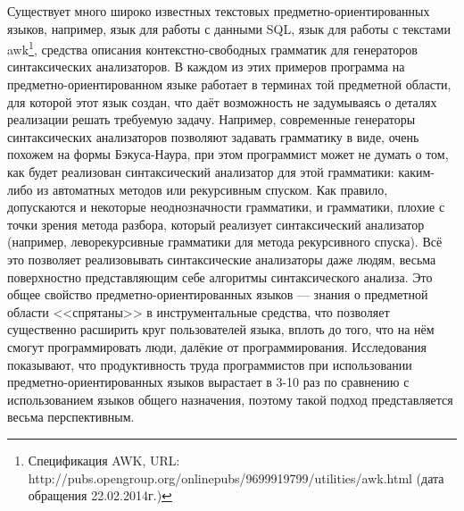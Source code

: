 Существует много широко известных текстовых предметно-ориентированных языков, 
например, язык для работы с данными \ac{SQL}, 
язык для работы с текстами awk\footnote{Спецификация AWK, URL: http://pubs.opengroup.org/onlinepubs/9699919799/utilities/awk.html 
(дата обращения 22.02.2014г.)}, средства описания контекстно-свободных грамматик для генераторов синтаксических 
анализаторов. В каждом из этих примеров программа на предметно-ориентированном 
языке работает в терминах той предметной области, для которой этот язык создан,
что даёт возможность не задумываясь о деталях реализации решать требуемую 
задачу. Например, современные генераторы синтаксических анализаторов позволяют 
задавать грамматику в виде, очень похожем на формы Бэкуса-Наура, при этом 
программист может не думать о том, как будет реализован синтаксический 
анализатор для этой грамматики: каким-либо из автоматных методов или рекурсивным 
спуском. Как правило, допускаются и некоторые неоднозначности грамматики, и 
грамматики, плохие с точки зрения метода разбора, который реализует 
синтаксический анализатор (например, леворекурсивные грамматики для метода 
рекурсивного спуска). Всё это позволяет реализовывать синтаксические анализаторы 
даже людям, весьма поверхностно представляющим себе алгоритмы синтаксического 
анализа. Это общее свойство предметно-ориентированных языков --- знания о 
предметной области <<спрятаны>> в инструментальные средства, что позволяет 
существенно расширить круг пользователей языка, вплоть до того, что на нём 
смогут программировать люди, далёкие от программирования. Исследования 
\cite{kieburtz1996software, kelly2000visual, gray2003examination} показывают, 
что продуктивность труда программистов при использовании 
предметно-ориентированных языков вырастает в 3-10 раз по сравнению с 
использованием языков общего назначения, поэтому такой подход представляется 
весьма перспективным.

